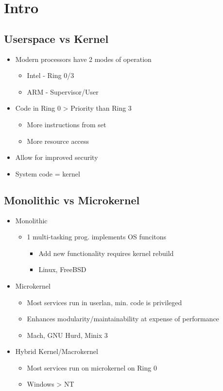 \section{Intro}

\subsection{Userspace vs Kernel}

\begin{itemize}
	\item Modern processors have 2 modes of operation
	\begin{itemize}
		\item Intel - Ring 0/3
		\item ARM - Supervisor/User
	\end{itemize}
	\item Code in Ring 0 > Priority than Ring 3
	\begin{itemize}
		\item More instructions from set
		\item More resource access
	\end{itemize}
	\item Allow for improved security
	\item System code = kernel
\end{itemize}

\subsection{Monolithic vs Microkernel}

\begin{itemize}
	\item Monolithic
	\begin{itemize}
		\item 1 multi-tasking prog. implements OS funcitons
		\begin{itemize}
			\item Add new functionality requires kernel rebuild
			\item Linux, FreeBSD
		\end{itemize}
	\end{itemize}
	\item Microkernel
	\begin{itemize}
		\item Most services run in userlan, min. code is privileged
		\item Enhances modularity/maintainability at expense of
			performance
		\item Mach, GNU Hurd, Minix 3
	\end{itemize}
	\item Hybrid Kernel/Macrokernel
	\begin{itemize}
		\item Most services run on microkernel on Ring 0
		\item Windows > NT
	\end{itemize}
\end{itemize}

